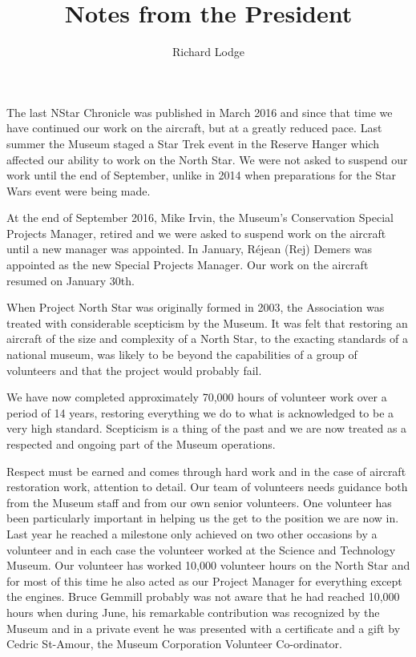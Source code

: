 
%


\title{Notes from the President}
\author{Richard Lodge}

\maketitle

The last NStar Chronicle was published in March 2016 and since that time we have
continued our work on the aircraft, but at a greatly reduced pace. Last summer
the Museum staged a Star Trek event in the Reserve Hanger which affected our
ability to work on the North Star. We were not asked to suspend our work until
the end of September, unlike in 2014 when preparations for the Star Wars event
were being made. 

At the end of September 2016, Mike Irvin, the Museum's Conservation Special Projects
Manager, retired and we were asked to suspend work on the aircraft until a new
manager was appointed. In January, R\'{e}jean (Rej) Demers was appointed as the new
Special Projects Manager. Our work on the aircraft resumed on January 30th.

When Project North Star was originally formed in 2003, the Association was
treated with considerable scepticism by the Museum. It was felt that restoring
an aircraft of the size and complexity of a North Star, to the exacting
standards of a national museum, was likely to be beyond the capabilities of a
group of volunteers and that the project would probably fail.

We have now completed approximately 70,000 hours of volunteer work over a period
of 14 years, restoring everything we do to what is acknowledged to be a very
high standard. Scepticism is a thing of the past and we are now treated as a
respected and ongoing part of the Museum operations.

Respect must be earned and comes through hard work and in the case of aircraft
restoration work, attention to detail. Our team of volunteers needs guidance
both from the Museum staff and from our own senior volunteers. One volunteer has
been particularly important in helping us the get to the position we are now in.
Last year he reached a milestone only achieved on two other occasions by a
volunteer and in each case the volunteer worked at the Science and Technology
Museum. Our volunteer has worked 10,000 volunteer hours on the North Star and
for most of this time he also acted as our Project Manager for everything except
the engines. Bruce Gemmill probably was not aware that he had reached 10,000
hours when during June, his remarkable contribution was recognized by the Museum
and in a private event he was presented with a certificate and a gift by Cedric
St-Amour, the Museum Corporation Volunteer Co-ordinator.

